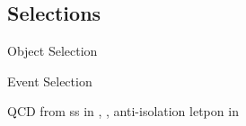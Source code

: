 \subsection{Selections}
\begin{frame}{Object Selection}
    \begin{table}
        \centering
        \setlength{\tabcolsep}{1em}
        \renewcommand{\arraystretch}{1.5}
        \resizebox{0.95\textwidth}{!}{}
    \end{table}
\end{frame}

\begin{frame}{Event Selection}
    \begin{table}
        \centering
        \setlength{\tabcolsep}{1em}
        \renewcommand{\arraystretch}{1.5}
        \resizebox{0.95\textwidth}{!}{}
    \end{table}
    QCD from ss in \cet, \cmt, \cem
    anti-isolation letpon in \ceh \cmh
\end{frame}






